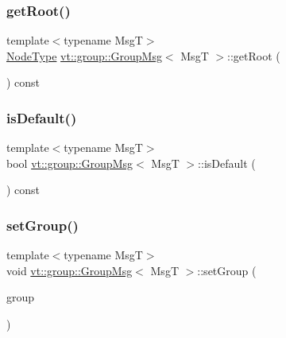 \subsubsection{\texorpdfstring{get\+Root()}{getRoot()}}
{\footnotesize\ttfamily template$<$typename MsgT$>$ \\
\hyperlink{namespacevt_a866da9d0efc19c0a1ce79e9e492f47e2}{Node\+Type} \hyperlink{structvt_1_1group_1_1_group_msg}{vt\+::group\+::\+Group\+Msg}$<$ MsgT $>$\+::get\+Root (\begin{DoxyParamCaption}{ }\end{DoxyParamCaption}) const\hspace{0.3cm}{\ttfamily [inline]}}

\mbox{\label{structvt_1_1group_1_1_group_msg_aedab140ac671d3a1830bafd787d8f780}} 
\subsubsection{\texorpdfstring{is\+Default()}{isDefault()}}
{\footnotesize\ttfamily template$<$typename MsgT$>$ \\
bool \hyperlink{structvt_1_1group_1_1_group_msg}{vt\+::group\+::\+Group\+Msg}$<$ MsgT $>$\+::is\+Default (\begin{DoxyParamCaption}{ }\end{DoxyParamCaption}) const\hspace{0.3cm}{\ttfamily [inline]}}

\mbox{\label{structvt_1_1group_1_1_group_msg_a69b6ab8f196f0e84ffa52a2c71ddbe3f}} 
\subsubsection{\texorpdfstring{set\+Group()}{setGroup()}}
{\footnotesize\ttfamily template$<$typename MsgT$>$ \\
void \hyperlink{structvt_1_1group_1_1_group_msg}{vt\+::group\+::\+Group\+Msg}$<$ MsgT $>$\+::set\+Group (\begin{DoxyParamCaption}\item[{\hyperlink{namespacevt_a27b5e4411c9b6140c49100e050e2f743}{Group\+Type} const \&}]{group }\end{DoxyParamCaption})\hspace{0.3cm}{\ttfamily [inline]}}

